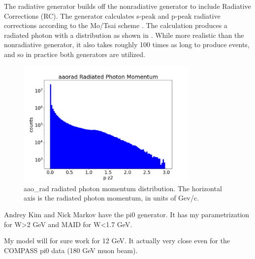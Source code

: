 The radiative generator builds off the nonradiative generator to include Radiative Corrections (RC). The generator calculates s-peak and p-peak radiative corrections according to the Mo/Tsai scheme \parencite{MO1969RadiativeScattering}. The calculation produces a radiated photon with a distribution as shown in . While more realistic than the nonradiative generator, it also takes roughly 100 times as long to produce events, and so in practice both generators are utilized. 


    \begin{figure}
        \centering
        \includegraphics[trim={0 1.25cm 0 2.5cm},clip,width=0.79\textwidth]{Chapters/Ch3-Simulations/event_generation/pics/radiated_photon_momentum.png}
        \caption[aao\_rad radiated photon momentum distribution]{aao\_rad radiated photon momentum distribution. The horizontal axis is the radiated photon momentum, in units of Gev/c.}
        \label{fig:aao_rad_mom_distribution}
    \end{figure}
    
    

\iffalse
Andrey Kim and Nick Markov have the pi0 generator. It has my parametrization for W>2 GeV and MAID for W<1.7 GeV.

My model will for sure work for 12 GeV. It actually very close even for the COMPASS pi0 data (180 GeV muon beam).

